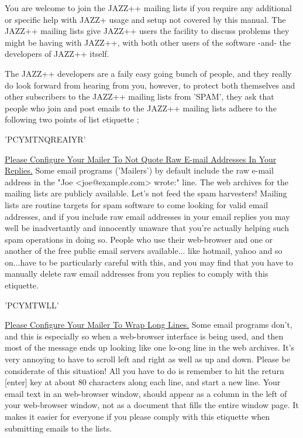 \documentclass[letterpaper]{report}
\begin{document}
You are welcome to join the JAZZ++ mailing lists if you require any additional
or specific help with JAZZ+ usage and setup not covered by this manual. The
JAZZ++ mailing lists give JAZZ++ users the facility to discuss problems they
might be having with JAZZ++, with both other users of the software -and- the
developers of JAZZ++ itself.

The JAZZ++ developers are a faily easy going bunch of people, and they really do
look forward from hearing from you, however, to protect both themselves and
other subscribers to the JAZZ++ mailing lists from 'SPAM', they ask that people
who join and post emails to the JAZZ++ mailing lists adhere to the following
two points of list etiquette ;

'PCYMTNQREAIYR'

\underline{Please Configure Your Mailer To Not Quote Raw E-mail Addresses In
Your Replies.}
Some email programs ('Mailers') by default include the raw e-mail address in the
"Joe <joe@example.com> wrote:" line. The web archives for the mailing lists are
publicly available. Let's not feed the spam harvesters! Mailing lists are
routine targets for spam software to come looking for valid email addresses, and
if you include raw email addresses in your email replies you may well be
inadvertantly and innocently unaware that you're actually helping such spam
operations in doing so. People who use their web-browser and one or another of
the free public email servers available... like hotmail, yahoo and so on...have
to be particularly careful with this, and you may find that you have to manually
delete raw email addresses from you replies to comply with this etiquette.

'PCYMTWLL'

\underline{Please Configure Your Mailer To Wrap Long Lines.} Some email programs
don't, and
this is especially so when a web-browser interface is being used, and then most
of the message ends up looking like one lo-ong line in the web archives. It's
very annoying to have to scroll left and right as well as up and down. Please be
considerate of this situation! All you have to do is remember to hit the return
[enter] key at about 80 characters along each line, and start a new line. Your
email text in an web-browser window, should appear as a column in the left of
your web-browser window, not as a document that fills the entire window page. It
makes it easier for everyone if you please comply with this etiquette when
submitting emails to the lists. 

\begin{indented}{2cm}
\end{indented}
\end{document}
